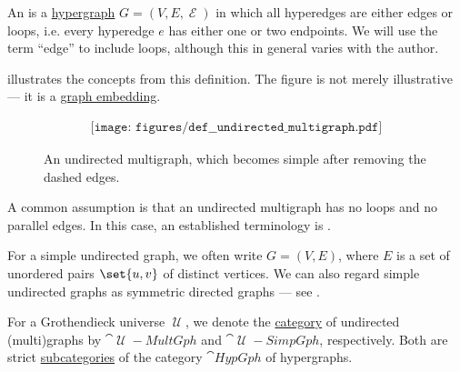 \begin{definition}\label{def:undirected_multigraph}
  An  is a \hyperref[def:hypergraph]{hypergraph} \( G = (V, E, \mscrE) \) in which all hyperedges are either edges or loops, i.e. every hyperedge \( e \) has either one or two endpoints. We will use the term \enquote{edge} to include loops, although this in general varies with the author.

   illustrates the concepts from this definition. The figure is not merely illustrative --- it is a \hyperref[def:quiver_geometric_realization/embedding]{graph embedding}.

  \begin{figure}[h]
    \begin{equation}\label{eq:fig:def:undirected_multigraph}
      \begin{aligned}
        \texttt{[image: figures/def\_\_undirected\_multigraph.pdf]}
      \end{aligned}
    \end{equation}
    \caption{An undirected multigraph, which becomes simple after removing the dashed edges.}\label{fig:def:undirected_multigraph}
  \end{figure}

  \begin{thmenum}
     A common assumption is that an undirected multigraph has no loops and no parallel edges. In this case, an established terminology is .

    For a simple undirected graph, we often write \( G = (V, E) \), where \( E \) is a set of unordered pairs \( \set{ u, v } \) of distinct vertices. We can also regard simple undirected graphs as symmetric directed graphs --- see .

     For a Grothendieck universe \( \mscrU \), we denote the \hyperref[def:category]{category} of undirected (multi)graphs by \( \cat{\mscrU-MultGph} \) and \( \cat{\mscrU-SimpGph} \), respectively. Both are strict \hyperref[def:subcategory]{subcategories} of the category \hyperref[def:category_of_small_hypergraphs]{\( \cat{HypGph} \)} of hypergraphs.
  \end{thmenum}
\end{definition}

